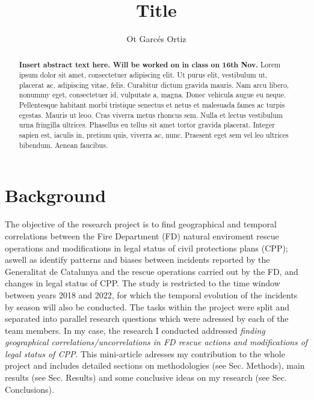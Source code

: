 \documentclass[
  journal=small,
  manuscript=mini-article,  %
  year=2023,
  volume=1,
]{odj-journal}
\title{Title}
\author{Ot Garcés Ortiz}
\affiliation{Departament de Física de la Matèria Condensada,  Barcelona, Spain.}
\begin{document}
\begin{abstract}
\textbf{Insert abstract text here. Will be worked on in class on 16th Nov.} Lorem ipsum dolor sit amet, consectetuer adipiscing elit. Ut purus elit, vestibulum ut, placerat ac, adipiscing vitae, felis. Curabitur dictum gravida mauris. Nam arcu libero, nonummy eget, consectetuer id, vulputate a, magna. Donec vehicula augue eu neque. Pellentesque habitant morbi tristique senectus et netus et malesuada fames ac turpis egestas. Mauris ut leoo. Cras viverra metus rhoncus
sem. Nulla et lectus vestibulum urna fringilla ultrices. Phasellus eu tellus sit amet
tortor gravida placerat. Integer sapien est, iaculis in, pretium quis, viverra ac, nunc.
Praesent eget sem vel leo ultrices bibendum. Aenean faucibus.
\end{abstract}
\vspace{-0.7cm}
\section{Background}
The objective of the research project is to find geographical and temporal correlations between the Fire Department (FD) natural enviroment rescue operations and modifications in legal status of civil protections plans (CPP); aswell as identify patterns and biases between incidents reported by the Generalitat de Catalunya and the rescue operations carried out by the FD, and changes in legal status of CPP. The study is restricted to the time window between years 2018 and 2022, for which the temporal evolution of the incidents by season will also be conducted. The tasks within the project were split and separated into parallel research questions which were adressed by each of the team members. In my case, the research I conducted addressed \textit{finding geographical correlations/uncorrelations in FD rescue actions and modifications of legal status of CPP}. This mini-article adresses my contribution to the whole project and includes detailed sections on methodologies (see Sec. Methods), main results (see Sec. Results) and some conclusive ideas on my research (see Sec. Conclusions). \\
\end{document}
